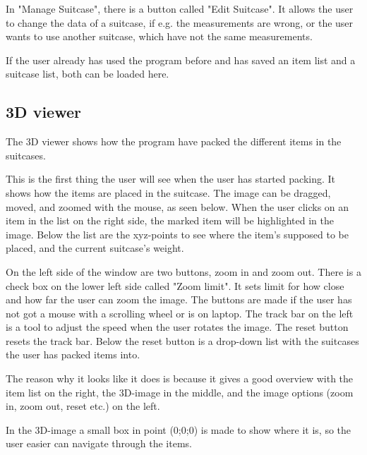 In "Manage Suitcase", there is a button called "Edit Suitcase". It allows the user to change the data of a suitcase, if e.g. the measurements are wrong, or the user wants to use another suitcase, which have not the same measurements.

If the user already has used the program before and has saved an item list and a suitcase list, both can be loaded here.

\subsection{3D viewer}
The 3D viewer shows how the program have packed the different items in the suitcases.


This is the first thing the user will see when the user has started packing. It shows how the items are placed in the suitcase.
The image can be dragged, moved, and zoomed with the mouse, as seen below. When the user clicks on an item in the list on the right side, the marked item will be highlighted in the image. Below the list are the xyz-points to see where the item's supposed to be placed, and the current suitcase's weight. 


On the left side of the window are two buttons, zoom in and zoom out. There is a check box on the lower left side called "Zoom limit". It sets limit for how close and how far the user can zoom the image. The buttons are made if the user has not got a mouse with a scrolling wheel or is on laptop. The track bar on the left is a tool to adjust the speed when the user rotates the image. The reset button resets the track bar. Below the reset button is a drop-down list with the suitcases the user has packed items into.

The reason why it looks like it does is because it gives a good overview with the item list on the right, the 3D-image in the middle, and the image options (zoom in, zoom out, reset etc.) on the left.

In the 3D-image a small box in point (0;0;0) is made to show where it is, so the user easier can navigate through the items.